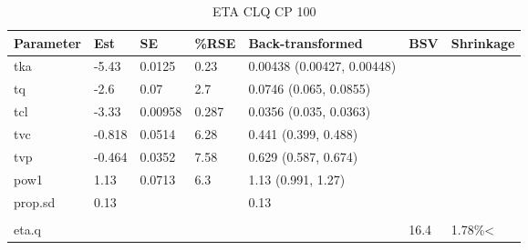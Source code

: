 \begin{table}
\centering\centering
\caption{ETA CLQ CP 100}
\centering
\fontsize{8}{10}\selectfont
\begin{tabular}[t]{lllllll}
\toprule
\textbf{Parameter} & \textbf{Est} & \textbf{SE} & \textbf{\%RSE} & \textbf{Back-transformed} & \textbf{BSV} & \textbf{Shrinkage}\\
\midrule
tka & -5.43 & 0.0125 & 0.23 & 0.00438 (0.00427, 0.00448) &  & \\
\midrule
tq & -2.6 & 0.07 & 2.7 & 0.0746 (0.065, 0.0855) &  & \\
\midrule
tcl & -3.33 & 0.00958 & 0.287 & 0.0356 (0.035, 0.0363) &  & \\
\midrule
tvc & -0.818 & 0.0514 & 6.28 & 0.441 (0.399, 0.488) &  & \\
\midrule
tvp & -0.464 & 0.0352 & 7.58 & 0.629 (0.587, 0.674) &  & \\
\midrule
pow1 & 1.13 & 0.0713 & 6.3 & 1.13 (0.991, 1.27) &  & \\
\midrule
prop.sd & 0.13 &  &  & 0.13 &  & \\
\midrule\\
eta.q &  &  &  &  & 16.4 & 1.78\%<\\
\bottomrule
\end{tabular}
\end{table}